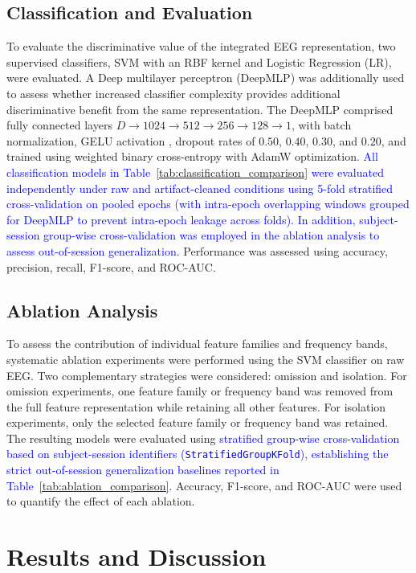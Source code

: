 \documentclass[conference]{IEEEtran}
\begin{document}
\subsection{Classification and Evaluation}
To evaluate the discriminative value of the integrated EEG representation, two supervised classifiers, SVM with an RBF kernel and Logistic Regression (LR), were evaluated. A Deep multilayer perceptron (DeepMLP) was additionally used to assess whether increased classifier complexity provides additional discriminative benefit from the same representation. The
DeepMLP comprised fully connected layers $D\rightarrow1024\rightarrow512\rightarrow256\rightarrow128\rightarrow1$, with batch normalization, GELU activation \cite{hendrycks2016gaussian}, dropout rates of $0.50$, $0.40$, $0.30$, and $0.20$, and trained using weighted binary cross-entropy with AdamW \cite{loshchilov2017decoupled} optimization. 
\textcolor{blue}{All classification models in Table~\ref{tab:classification_comparison} were evaluated independently under raw and artifact-cleaned conditions using 5-fold stratified cross-validation on pooled epochs (with intra-epoch overlapping windows grouped for DeepMLP to prevent intra-epoch leakage across folds). In addition, subject-session group-wise cross-validation was employed in the ablation analysis to assess out-of-session generalization.} Performance was assessed
using accuracy, precision, recall, F1-score, and ROC-AUC.

\subsection{Ablation Analysis}
To assess the contribution of individual feature families and frequency bands,
systematic ablation experiments were performed using the SVM classifier on raw
EEG. Two complementary strategies were considered: omission and isolation.
For omission experiments, one feature family or frequency band was removed
from the full feature representation while retaining all other features. For
isolation experiments, only the selected feature family or frequency band was
retained. The resulting models were evaluated using \textcolor{blue}{stratified group-wise cross-validation based on subject-session identifiers (\texttt{StratifiedGroupKFold}), establishing the strict out-of-session generalization baselines reported in Table~\ref{tab:ablation_comparison}.} Accuracy, F1-score,
and ROC-AUC were used to quantify the effect of each ablation.

\section{Results and Discussion}
\end{document}
